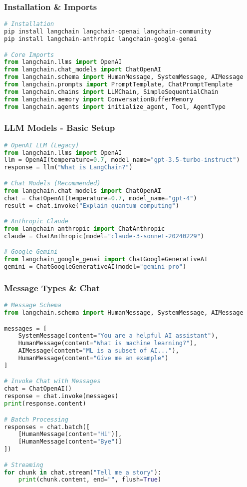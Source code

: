\begin{frame}[fragile]\frametitle{Installation \& Imports}
\begin{lstlisting}[language=python,basicstyle=\tiny]
# Installation
pip install langchain langchain-openai langchain-community
pip install langchain-anthropic langchain-google-genai

# Core Imports
from langchain.llms import OpenAI
from langchain.chat_models import ChatOpenAI
from langchain.schema import HumanMessage, SystemMessage, AIMessage
from langchain.prompts import PromptTemplate, ChatPromptTemplate
from langchain.chains import LLMChain, SimpleSequentialChain
from langchain.memory import ConversationBufferMemory
from langchain.agents import initialize_agent, Tool, AgentType
\end{lstlisting}
\end{frame}

\begin{frame}[fragile]\frametitle{LLM Models - Basic Setup}
\begin{lstlisting}[language=python,basicstyle=\tiny]
# OpenAI LLM (Legacy)
from langchain.llms import OpenAI
llm = OpenAI(temperature=0.7, model_name="gpt-3.5-turbo-instruct")
response = llm("What is LangChain?")

# Chat Models (Recommended)
from langchain.chat_models import ChatOpenAI
chat = ChatOpenAI(temperature=0.7, model_name="gpt-4")
result = chat.invoke("Explain quantum computing")

# Anthropic Claude
from langchain_anthropic import ChatAnthropic
claude = ChatAnthropic(model="claude-3-sonnet-20240229")

# Google Gemini
from langchain_google_genai import ChatGoogleGenerativeAI
gemini = ChatGoogleGenerativeAI(model="gemini-pro")
\end{lstlisting}
\end{frame}

\begin{frame}[fragile]\frametitle{Message Types \& Chat}
\begin{lstlisting}[language=python,basicstyle=\tiny]
# Message Schema
from langchain.schema import HumanMessage, SystemMessage, AIMessage

messages = [
    SystemMessage(content="You are a helpful AI assistant"),
    HumanMessage(content="What is machine learning?"),
    AIMessage(content="ML is a subset of AI..."),
    HumanMessage(content="Give me an example")
]

# Invoke Chat with Messages
chat = ChatOpenAI()
response = chat.invoke(messages)
print(response.content)

# Batch Processing
responses = chat.batch([
    [HumanMessage(content="Hi")],
    [HumanMessage(content="Bye")]
])

# Streaming
for chunk in chat.stream("Tell me a story"):
    print(chunk.content, end="", flush=True)
\end{lstlisting}
\end{frame}

